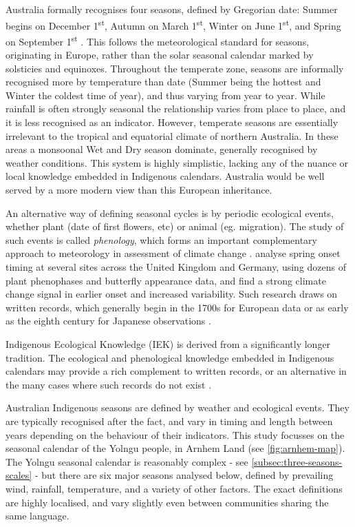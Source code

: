 Australia formally recognises four seasons, defined by Gregorian date:
Summer begins on December 1\textsuperscript{st}, Autumn on March
1\textsuperscript{st}, Winter on June 1\textsuperscript{st}, and Spring
on September 1\textsuperscript{st} \citep{wells2013}. This follows the
meteorological standard for seasons, originating in Europe, rather
than the solar seasonal calendar marked by solsticies and equinoxes.
%
Throughout the temperate zone, seasons are informally recognised more by
temperature than date (Summer being the hottest and Winter the coldest time
of year), and thus varying from year to year.  While rainfall is often
strongly  seasonal the relationship varies from place to place, and it is
less recognised as an indicator.
%
However, temperate seasons are essentially irrelevant to the tropical and
equatorial climate of northern Australia.  In these areas a monsoonal Wet
and Dry season dominate, generally recognised by weather conditions.
This system is highly simplistic, lacking any of the nuance or local
knowledge embedded in Indigenous calendars.  Australia would be well
served by a more modern view than this European inheritance.


An alternative way of defining seasonal cycles is by periodic ecological
events, whether plant (date of first flowers, etc) or animal (eg. migration).
The study of such events is called \textit{phenology}, which forms an
important complementary approach to meteorology in assessment of climate
change \citep[eg.][]{roy2000}.  \citet{menzel2006} analyse spring onset timing
at several sites across the United Kingdom and Germany, using dozens of
plant phenophases and butterfly appearance data, and find a strong climate
change signal in earlier onset and increased variability.  Such research
draws on written records, which generally begin in the 1700s for European
data or as early as the eighth century for Japanese observations \citep{sparks2002}.

Indigenous Ecological Knowledge (IEK) is derived from a significantly longer
tradition.  The ecological and phenological knowledge embedded
in Indigenous calendars may provide a rich complement to written records,
or an alternative in the many cases where such records do not exist .


Australian Indigenous seasons are defined by weather and ecological events.
They are typically recognised after the fact, and vary in timing and length
between years depending on the behaviour of their indicators.  This study
focusses on the seasonal calendar of the Yolngu people, in Arnhem Land (see
\cref{fig:arnhem-map}).
%
The Yolngu seasonal calendar is reasonably complex - see
\cref{subsec:three-seasons-scales} - but there are six major seasons
analysed below, defined by prevailing wind, rainfall, temperature, and a
variety of other factors.  The exact definitions are highly localised,
and vary slightly even between communities sharing the same language.




